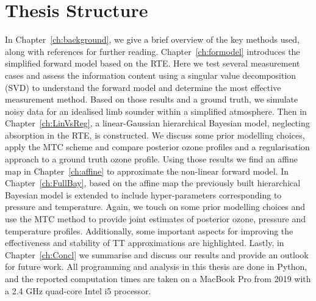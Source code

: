 \section{Thesis Structure}
In Chapter~\ref{ch:background}, we give a brief overview of the key methods used, along with references for further reading.
Chapter~\ref{ch:formodel} introduces the simplified forward model based on the RTE.
Here we test several measurement cases and assess the information content using a singular value decomposition (SVD) to understand the forward model and determine the most effective measurement method.
Based on those results and a ground truth, we simulate noisy data for an idealised limb sounder within a simplified atmosphere.
Then in Chapter~\ref{ch:LinVsReg}, a linear-Gaussian hierarchical Bayesian model, neglecting absorption in the RTE, is constructed.
We discuss some prior modelling choices, apply the MTC scheme and compare posterior ozone profiles and a regularisation approach to a ground truth ozone profile.
Using those results we find an affine map in Chapter~\ref{ch:affine} to approximate the non-linear forward model.
In Chapter~\ref{ch:FullBay}, based on the affine map the previously built hierarchical Bayesian model is extended to include hyper-parameters corresponding to pressure and temperature.
Again, we touch on some prior modelling choices and use the MTC method to provide joint estimates of posterior ozone, pressure and temperature profiles.
Additionally, some important aspects for improving the effectiveness and stability of TT approximations are highlighted.
Lastly, in Chapter~\ref{ch:Concl} we summarise and discuss our results and provide an outlook for future work.
All programming and analysis in this thesis are done in Python, and the reported computation times are taken on a MacBook Pro from 2019 with a 2.4 GHz quad-core Intel i5 processor.
